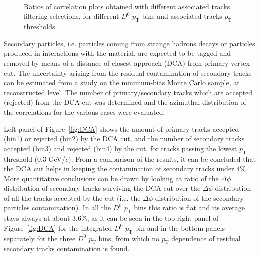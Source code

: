 \begin{figure}[h]
\centering
{}
 \\
 \\
 \\
 \caption{Ratios of correlation plots obtained with different associated tracks filtering selections, for different $D^0$ $p_\text{T}$ bins and associated tracks $p_\text{T}$ thresholds.}
 \label{fig:Syst_EffTrack}
\end{figure}

Secondary particles, i.e. particles coming from strange hadrons decays or particles produced in interactions with the material, are expected to be tagged and removed by means of a distance of closest approach (DCA) from primary vertex cut. The uncertainty arising from the residual contamination of secondary tracks can be estimated from a study on the minimum-bias Monte Carlo sample, at reconstructed level. The number of primary/secondary tracks which are accepted (rejected) from the DCA cut was determined and the azimuthal distribution of the correlations for the various cases were evaluated.

Left panel of Figure~\ref{fig:DCA} shows the amount of primary tracks accepted (bin1) or rejected (bin2) by the DCA cut, and the number of secondary tracks accepted (bin3) and rejected (bin4) by the cut, for tracks passing the lowest $p_\text{T}$ threshold (0.3 GeV/$c$). From a comparison of the results, it can be concluded that the DCA cut helps in keeping the contamination of secondary tracks under 4\%. More quantitative conclusions can be drawn by looking at ratio of the $\Delta\phi$ distribution of secondary tracks surviving the DCA cut over the $\Delta\phi$ distribution of all the tracks accepted by the cut (i.e. the $\Delta\phi$ distribution of the secondary particles contamination). In all the $D^0$ $p_\text{T}$ bins this ratio is flat and its average stays always at about 3.6\%, as it can be seen in the top-right panel of Figure~\ref{fig:DCA} for the integrated $D^0$ $p_\text{T}$ bin and in the bottom panels separately for the three $D^0$ $p_\text{T}$ bins, from which no $p_\text{T}$ dependence of residual secondary tracks contamination is found.

